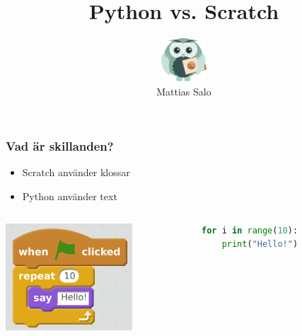 \documentclass{beamer}
\author[Mattias Salo]{\includegraphics[width=1.7cm]{../logo.png}\\Mattias Salo}
\title{Python vs. Scratch}
\institute{CoderDojo Linköping}
\begin{document}
\begin{frame}
\maketitle
\end{frame}


\begin{frame}[fragile]
	\frametitle{Vad är skillanden?}

	\begin{itemize}
		\item{Scratch använder klossar}
		\item{Python använder text}
	\end{itemize}
	\begin{columns}[c] %
    \begin{center}
     \includegraphics[width=0.7\textwidth]{blocks/for_10.png}
     \end{center}
\begin{lstlisting}[language=Python]
for i in range(10):
    print("Hello!")
\end{lstlisting}
    \end{columns}
\end{frame}
\end{document}
